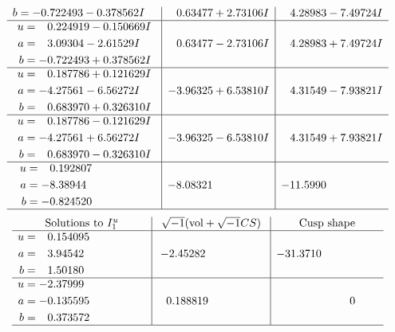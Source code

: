\documentclass[1p]{elsarticle_modified}
\theoremstyle{definition}
\newcommand{\I}{\sqrt{-1}}
\begin{document}
$$\begin{array}{c|c|c}
\begin{aligned}
b &= -0.722493 - 0.378562 I\end{aligned}
 & \phantom{-}0.63477 + 2.73106 I & \phantom{-}4.28983 - 7.49724 I \\ \hline\begin{aligned}
u &= \phantom{-}0.224919 - 0.150669 I \\
a &= \phantom{-}3.09304 - 2.61529 I \\
b &= -0.722493 + 0.378562 I\end{aligned}
 & \phantom{-}0.63477 - 2.73106 I & \phantom{-}4.28983 + 7.49724 I \\ \hline\begin{aligned}
u &= \phantom{-}0.187786 + 0.121629 I \\
a &= -4.27561 - 6.56272 I \\
b &= \phantom{-}0.683970 + 0.326310 I\end{aligned}
 & -3.96325 + 6.53810 I & \phantom{-}4.31549 - 7.93821 I \\ \hline\begin{aligned}
u &= \phantom{-}0.187786 - 0.121629 I \\
a &= -4.27561 + 6.56272 I \\
b &= \phantom{-}0.683970 - 0.326310 I\end{aligned}
 & -3.96325 - 6.53810 I & \phantom{-}4.31549 + 7.93821 I \\ \hline\begin{aligned}
u &= \phantom{-}0.192807\phantom{ +0.000000I} \\
a &= -8.38944\phantom{ +0.000000I} \\
b &= -0.824520\phantom{ +0.000000I}\end{aligned}
 & -8.08321\phantom{ +0.000000I} & -11.5990\phantom{ +0.000000I}\\
 \hline 
 \end{array}$$\newpage$$\begin{array}{c|c|c}  
\text{Solutions to }I^u_{1}& \I (\text{vol} + \sqrt{-1}CS) & \text{Cusp shape}\\
 \hline 
\begin{aligned}
u &= \phantom{-}0.154095\phantom{ +0.000000I} \\
a &= \phantom{-}3.94542\phantom{ +0.000000I} \\
b &= \phantom{-}1.50180\phantom{ +0.000000I}\end{aligned}
 & -2.45282\phantom{ +0.000000I} & -31.3710\phantom{ +0.000000I} \\ \hline\begin{aligned}
u &= -2.37999\phantom{ +0.000000I} \\
a &= -0.135595\phantom{ +0.000000I} \\
b &= \phantom{-}0.373572\phantom{ +0.000000I}\end{aligned}
 & \phantom{-}0.188819\phantom{ +0.000000I} & \phantom{-0.000000 } 0\\
 \hline 
 \end{array}$$\newpage\newpage\renewcommand{\arraystretch}{1}
\end{document}
